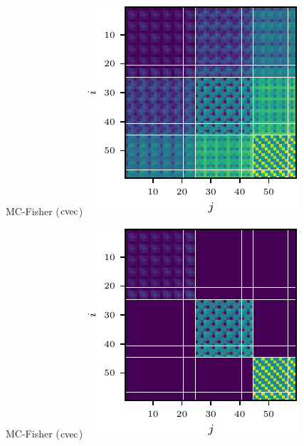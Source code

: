 \begin{figure}[t!]
\begin{minipage}[t]{0.485\linewidth}
  \end{minipage}
  \\
  \begin{minipage}[t]{0.485\linewidth}
    \centering
    MC-Fisher ($\operatorname{cvec}$)\vspace{1ex}
    \includegraphics[width=0.8\linewidth]{../kfs/plots/synthetic_cvec_mcfisher_100_full.pdf}
  \end{minipage}
  \hfill
  \begin{minipage}[t]{0.485\linewidth}
    \centering
    MC-Fisher ($\operatorname{cvec}$)\vspace{1ex}
    \includegraphics[width=0.8\linewidth]{../kfs/plots/synthetic_cvec_mcfisher_100_kfac.pdf}

\end{minipage}
\end{figure}
